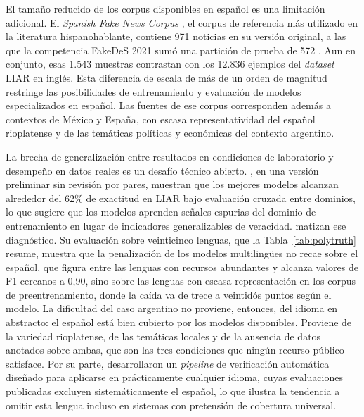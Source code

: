 El tamaño reducido de los corpus disponibles en español es una limitación adicional. El \textit{Spanish Fake News Corpus} \parencite{PosadasEtAl2019}, el corpus de referencia más utilizado en la literatura hispanohablante, contiene 971 noticias en su versión original, a las que la competencia FakeDeS 2021 sumó una partición de prueba de 572 \parencite{GomezAdornoEtAl2021}. Aun en conjunto, esas 1.543 muestras contrastan con los 12.836 ejemplos del \textit{dataset} LIAR \parencite{Wang2017} en inglés. Esta diferencia de escala de más de un orden de magnitud restringe las posibilidades de entrenamiento y evaluación de modelos especializados en español. Las fuentes de ese corpus corresponden además a contextos de México y España, con escasa representatividad del español rioplatense y de las temáticas políticas y económicas del contexto argentino.

La brecha de generalización entre resultados en condiciones de laboratorio y desempeño en datos reales es un desafío técnico abierto. \textcite{HasanEtAl2025}, en una versión preliminar sin revisión por pares, muestran que los mejores modelos alcanzan alrededor del 62\% de exactitud en LIAR bajo evaluación cruzada entre dominios, lo que sugiere que los modelos aprenden señales espurias del dominio de entrenamiento en lugar de indicadores generalizables de veracidad. \textcite{GoulievEtAl2025} matizan ese diagnóstico. Su evaluación sobre veinticinco lenguas, que la Tabla~\ref{tab:polytruth} resume, muestra que la penalización de los modelos multilingües no recae sobre el español, que figura entre las lenguas con recursos abundantes y alcanza valores de F1 cercanos a 0,90, sino sobre las lenguas con escasa representación en los corpus de preentrenamiento, donde la caída va de trece a veintidós puntos según el modelo. La dificultad del caso argentino no proviene, entonces, del idioma en abstracto: el español está bien cubierto por los modelos disponibles. Proviene de la variedad rioplatense, de las temáticas locales y de la ausencia de datos anotados sobre ambas, que son las tres condiciones que ningún recurso público satisface. Por su parte, \textcite{DrzchalEtAl2024} desarrollaron un \textit{pipeline} de verificación automática diseñado para aplicarse en prácticamente cualquier idioma, cuyas evaluaciones publicadas excluyen sistemáticamente el español, lo que ilustra la tendencia a omitir esta lengua incluso en sistemas con pretensión de cobertura universal.

